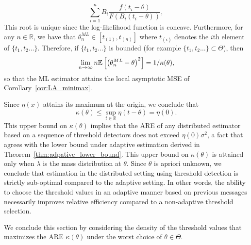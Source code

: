 \begin{equation}
\label{eq:ML}
\sum_{i=1}^n B_i \frac{f \left( t_i-\theta\right) }{F \left(B_i  (t_i-\theta)\right) },  
\end{equation}
This root is unique since the log-likelihood function is concave. Furthermore, for any $n \in \mathbb R$, we have that ${\theta}^{ML}_n  \in [t_{(1)}, t_{(n)}]$ where $t_{(i)}$ denotes the $i$th element of $\{t_1,t_2\ldots\}$. Therefore, if $\{t_1,t_2\ldots\}$ is bounded (for example $\{t_1,t_2\ldots\} \subset \Theta$), then 
\[
\lim_{n\to \infty} n \mathbb{E}\left[ \left({\theta}^{ML}_n - \theta \right)^2\right]  = 1/\kappa(\theta), 
\] 
so that the ML estimator attains the local asymptotic MSE of Corollary~\ref{cor:LA_minimax}. \par
%
Since $\eta(x)$ attains its maximum at the origin, we conclude that
\[
\kappa(\theta) \leq \sup_{t\in \mathbb R} \eta \left( t-\theta\right) = \eta(0).
\]
This upper bound on $\kappa(\theta)$ implies that the ARE of any distributed estimator based on a sequence of threshold detectors does not exceed $\eta(0)\sigma^2$, a fact that agrees with the lower bound under adaptive estimation derived in Theorem~\ref{thm:adpative_lower_bound}. 
%
This upper bound on $\kappa(\theta)$ is attained only when $\lambda$ is the mass distribution at $\theta$. Since $\theta$ is apriori unknown, we conclude that estimation in the distributed setting using threshold detection is strictly sub-optimal compared to the adaptive setting. In other words, the ability to choose the threshold values in an adaptive manner based on previous messages necessarily improves relative efficiency compared to a non-adaptive threshold selection.  \par


%
We conclude this section by considering the density of the threshold values that maximizes the ARE $\kappa(\theta)$ under the worst choice of $\theta \in \Theta$.

